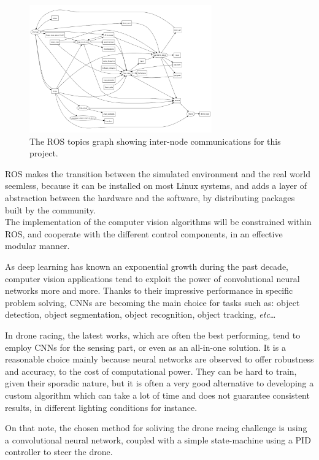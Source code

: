 \begin{figure}[h]
	\centering
	\includegraphics[width=0.7\textwidth]{figure/ros_topics.png}
	\caption{The ROS topics graph showing inter-node communications for this
	project.}
	\label{fig:ros-topics}
\end{figure}

ROS makes the transition between the simulated environment and the real world
seemless, because it can be installed on most Linux systems, and adds a layer
of abstraction between the hardware and the software, by distributing packages
built by the community.\\

The implementation of the computer vision algorithms will be constrained within
ROS, and cooperate with the different control components, in an effective
modular manner.\\



As deep learning has known an exponential growth during the past decade,
computer vision applications tend to exploit the power of convolutional neural
networks more and more. Thanks to their impressive performance in specific
problem solving, CNNs are becoming the main choice for tasks such as: object
detection, object segmentation, object recognition, object tracking,
\emph{etc}\ldots

In drone racing, the latest works, which are often the best performing, tend to
employ CNNs for the sensing part, or even as an all-in-one solution. It is a
reasonable choice mainly because neural networks are observed to offer
robustness and accuracy, to the cost of computational power. They can be hard
to train, given their sporadic nature, but it is often a very good alternative
to developing a custom algorithm which can take a lot of time and does not
guarantee consistent results, in different lighting conditions for instance.

On that note, the chosen method for soliving the drone racing challenge is
using a convolutional neural network, coupled with a simple state-machine 
using a PID controller to steer the drone.
